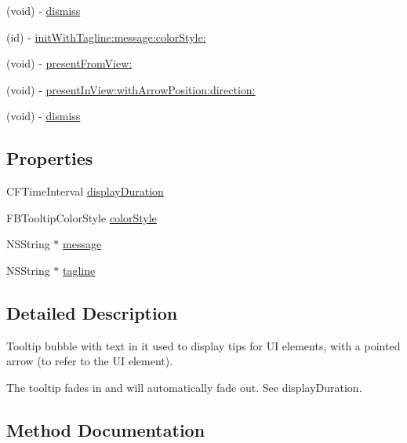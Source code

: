 \begin{DoxyCompactItemize}
\item 
(void) -\/ \hyperlink{interfaceFBTooltipView_a569c1c43f92dd609d969f75bf151ae87}{dismiss}
\item 
(id) -\/ \hyperlink{interfaceFBTooltipView_a810fa96eb99ba7b3055b90e9214a401c}{init\+With\+Tagline\+:message\+:color\+Style\+:}
\item 
(void) -\/ \hyperlink{interfaceFBTooltipView_a1f30bcab68dad52738ab50fd37855984}{present\+From\+View\+:}
\item 
(void) -\/ \hyperlink{interfaceFBTooltipView_ae7b47d160c23b6a26bf42018b0e3a551}{present\+In\+View\+:with\+Arrow\+Position\+:direction\+:}
\item 
(void) -\/ \hyperlink{interfaceFBTooltipView_a569c1c43f92dd609d969f75bf151ae87}{dismiss}
\end{DoxyCompactItemize}
\subsection*{Properties}
\begin{DoxyCompactItemize}
\item 
C\+F\+Time\+Interval \hyperlink{interfaceFBTooltipView_a7c907ee0bbcd20cfabd8c2122252c5d6}{display\+Duration}
\item 
F\+B\+Tooltip\+Color\+Style \hyperlink{interfaceFBTooltipView_aa8c3df2b58186ca9c0cc0d4f667c543e}{color\+Style}
\item 
N\+S\+String $\ast$ \hyperlink{interfaceFBTooltipView_a2ff5931a789e835afc1c1f25fae4626d}{message}
\item 
N\+S\+String $\ast$ \hyperlink{interfaceFBTooltipView_aebfc88cbda9be6d5eec325a6aa8a3fa0}{tagline}
\end{DoxyCompactItemize}


\subsection{Detailed Description}
Tooltip bubble with text in it used to display tips for UI elements, with a pointed arrow (to refer to the UI element).

The tooltip fades in and will automatically fade out. See {\ttfamily display\+Duration}. 

\subsection{Method Documentation}
\mbox{\label{interfaceFBTooltipView_a569c1c43f92dd609d969f75bf151ae87}} 
